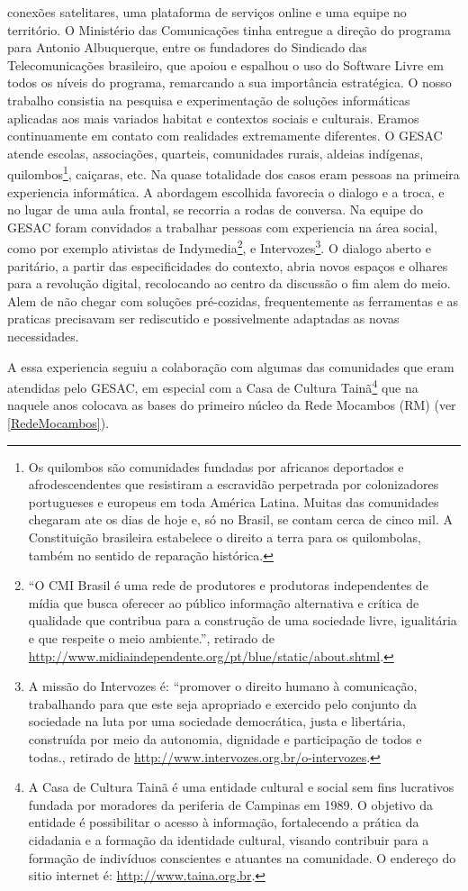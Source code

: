 conexões satelitares, uma plataforma de serviços online e uma equipe
no território. O Ministério das Comunicações tinha entregue a direção
do programa para Antonio Albuquerque, entre os fundadores do Sindicado
das Telecomunicações brasileiro, que apoiou e espalhou o uso do
Software Livre em todos os níveis do programa, remarcando a sua
importância estratégica. O nosso trabalho consistia na pesquisa e
experimentação de soluções informáticas aplicadas aos mais variados
habitat e contextos sociais e culturais. Eramos continuamente em
contato com realidades extremamente diferentes. O GESAC atende
escolas, associações, quarteis, comunidades rurais, aldeias indígenas,
quilombos\footnote{Os quilombos são comunidades fundadas por africanos
  deportados e afrodescendentes que resistiram a escravidão perpetrada
  por colonizadores portugueses e europeus em toda América
  Latina. Muitas das comunidades chegaram ate os dias de hoje e, só no
  Brasil, se contam cerca de cinco mil. A Constituição brasileira
  estabelece o direito a terra para os quilombolas, também no sentido
  de reparação histórica.}, caiçaras, etc. Na quase totalidade dos
casos eram pessoas na primeira experiencia informática. A abordagem
escolhida favorecia o dialogo e a troca, e no lugar de uma aula
frontal, se recorria a rodas de conversa. Na equipe do GESAC foram
convidados a trabalhar pessoas com experiencia na área social, como
por exemplo ativistas de Indymedia\footnote{``O CMI Brasil é uma rede
  de produtores e produtoras independentes de mídia que busca oferecer
  ao público informação alternativa e crítica de qualidade que
  contribua para a construção de uma sociedade livre, igualitária e
  que respeite o meio ambiente.'', retirado de
  \url{http://www.midiaindependente.org/pt/blue/static/about.shtml}.},
e Intervozes\footnote{A missão do Intervozes é: ``promover o direito
  humano à comunicação, trabalhando para que este seja apropriado e
  exercido pelo conjunto da sociedade na luta por uma sociedade
  democrática, justa e libertária, construída por meio da autonomia,
  dignidade e participação de todos e todas., retirado de
  \url{http://www.intervozes.org.br/o-intervozes}.}. O dialogo aberto
e paritário, a partir das especificidades do contexto, abria novos
espaços e olhares para a revolução digital, recolocando ao centro da
discussão o fim alem do meio. Alem de não chegar com soluções
pré-cozidas, frequentemente as ferramentas e as praticas precisavam
ser rediscutido e possivelmente adaptadas as novas necessidades.

A essa experiencia seguiu a colaboração com algumas das comunidades
que eram atendidas pelo GESAC, em especial com a Casa de Cultura
Tainã\footnote{A Casa de Cultura Tainã é uma entidade cultural e
  social sem fins lucrativos fundada por moradores da periferia de
  Campinas em 1989.  O objetivo da entidade é possibilitar o acesso à
  informação, fortalecendo a prática da cidadania e a formação da
  identidade cultural, visando contribuir para a formação de
  indivíduos conscientes e atuantes na comunidade. O endereço do sitio
  internet é: \url{http://www.taina.org.br}.} que na naquele anos
colocava as bases do primeiro núcleo da Rede Mocambos (RM) (ver
\ref{RedeMocambos}).

